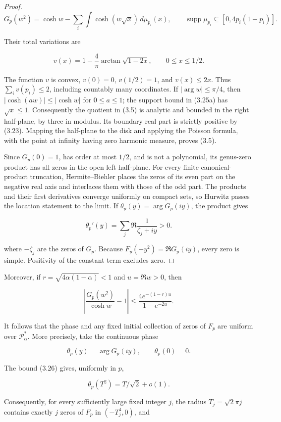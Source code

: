 \documentclass[11pt]{article}
\begin{document}
\begin{proof}
\[
 G_p(w^2)=\cosh w-
 \sum_i\int \cosh(w\sqrt{x})\,d\mu_{p_i}(x),
 \qquad
 \operatorname{supp}\mu_{p_i}\subseteq[0,4p_i(1-p_i)]. \tag{3.25a}
\]

Their total variations are

\[
 v(x)=1-\frac4\pi\arctan\sqrt{1-2x},\qquad 0\le x\le1/2. \tag{3.25}
\]

The function $v$ is convex, $v(0)=0$, $v(1/2)=1$, and $v(x)\le2x$.
Thus $\sum_i v(p_i)\le2$, including countably many coordinates.  If
$|\arg w|\le\pi/4$, then
$|\cosh(a w)|\le|\cosh w|$ for $0\le a\le1$; the support bound in
(3.25a) has $\sqrt{x}\le1$.  Consequently the quotient in (3.5) is
analytic and bounded in the right half-plane, by three in modulus.
Its boundary real part is strictly positive by (3.23).  Mapping the half-plane to
the disk and applying the Poisson formula, with the point at infinity having zero
harmonic measure, proves (3.5).

Since $G_p(0)=1$, has order at most $1/2$, and is not a polynomial, its
genus-zero product has all zeros in the open left half-plane.  For every finite
canonical-product truncation, Hermite--Biehler places the zeros of its even part
on the negative real axis and interlaces them with those of the odd part.
The products and their first derivatives converge uniformly on compact sets, so
Hurwitz passes the location statement to the limit.  If
$\theta_p(y)=\arg G_p(iy)$, the product gives

\[
 \theta_p'(y)=\sum_j\Re\frac1{\zeta_j+iy}>0. \tag{3.25b}
\]

where $-\zeta_j$ are the zeros of $G_p$.  Because
$F_p(-y^2)=\Re G_p(iy)$, every zero is simple.  Positivity of the constant term
excludes zero.
\end{proof}


Moreover, if $r=\sqrt{4\alpha(1-\alpha)}<1$ and $u=\Re w>0$, then

\[
\left|\frac{G_p(w^2)}{\cosh w}-1\right|
\le \frac{4e^{-(1-r)u}}{1-e^{-2u}}. \tag{3.26}
\]

It follows that the phase and any fixed initial collection of zeros of $F_p$
are uniform over $\mathcal P_\alpha^*$.  More precisely, take the continuous
phase

\[
\theta_p(y)=\arg G_p(iy),\qquad \theta_p(0)=0.
\]

The bound (3.26) gives, uniformly in $p$,

\[
\theta_p(T^2)=T/\sqrt2+o(1). \tag{3.27}
\]

Consequently, for every sufficiently large fixed integer $j$, the radius
$T_j=\sqrt2\pi j$ contains exactly $j$ zeros of $F_p$ in
$(-T_j^4,0)$, and
\end{document}
